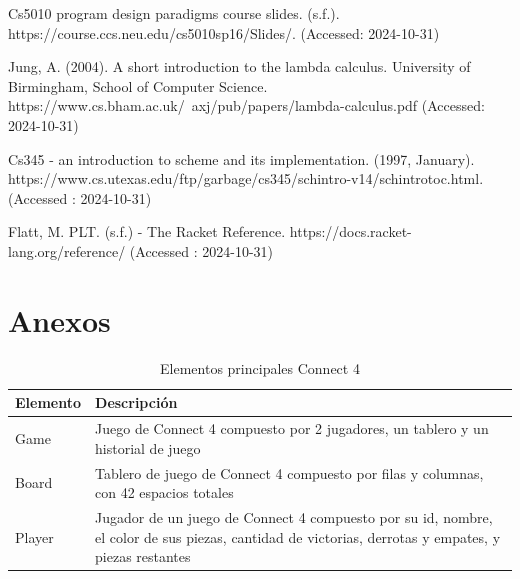\documentclass[12pt]{article}
\begin{document}
	\clearpage
	\begin{thebibliography}{}
		{Cs5010 program design paradigms course slides. (s.f.). https://course.ccs.neu.edu/cs5010sp16/Slides/.} (Accessed: 2024-10-31)
		
		{Jung, A. (2004). A short introduction to the lambda calculus. University of Birmingham, School of Computer Science. https://www.cs.bham.ac.uk/~axj/pub/papers/lambda-calculus.pdf} (Accessed: 2024-10-31)
		
		{Cs345 - an introduction to scheme and its implementation. (1997, January). https://www.cs.utexas.edu/ftp/garbage/cs345/schintro-v14/schintrotoc.html.} (Accessed : 2024-10-31)
		
		{Flatt, M. PLT. (s.f.) - The Racket Reference. https://docs.racket-lang.org/reference/} (Accessed : 2024-10-31)
		
	\end{thebibliography}
	\clearpage
	
	\section{Anexos}
	\begin{table}[h]
		\centering
		\begin{tabular}{|l|p{7cm}|}
			\hline
			\textbf{Elemento} & \textbf{Descripción} \\
			\hline
			Game &  Juego de Connect 4 compuesto por 2 jugadores, un tablero y un historial de juego\\
			\hline
			Board &  Tablero de juego de Connect 4 compuesto por filas y columnas, con 42 espacios totales\\
			\hline
			Player &  Jugador de un juego de Connect 4 compuesto por su id, nombre, el color de sus piezas, cantidad de victorias, derrotas y empates, y piezas restantes\\
			\hline
		\end{tabular}
		\caption{Elementos principales Connect 4}
		\label{tab:TDAs}
	\end{table}
	
\end{document}
